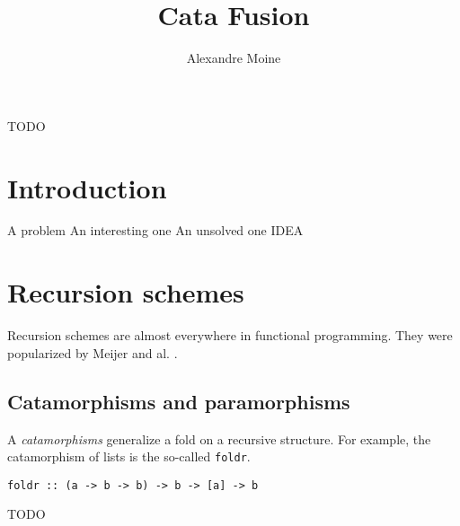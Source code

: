 \documentclass[format=sigplan]{acmart}
\newcommand{\minline}[1]{\texttt{#1}}
\begin{document}
\title{Cata Fusion}
\author{Alexandre Moine}


\begin{abstract}
\end{abstract}
	
%
%
\begin{CCSXML}
TODO
\end{CCSXML}
	
	
%
	
	
%
\maketitle

\section{Introduction}

A problem
An interesting one
An unsolved one
IDEA
	
\section{Recursion schemes}
Recursion schemes are almost everywhere in functional programming. They were popularized by Meijer and al. \cite{4cec4a43c86444479dc0003182424795}.

\subsection{Catamorphisms and paramorphisms}
A \emph{catamorphisms} generalize a fold on a recursive structure. For example, the catamorphism of lists is the so-called \minline{foldr}.
\begin{verbatim}
foldr :: (a -> b -> b) -> b -> [a] -> b
\end{verbatim}
TODO
\end{document}
